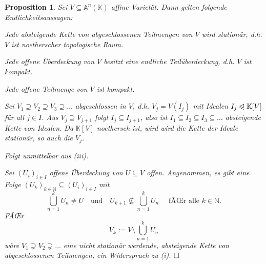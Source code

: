 \documentclass[11pt]{book}
\newtheorem{prop}[theorem]{Proposition}
\theoremstyle{nonumberbreak}
\newenvironment{pr}[1][]{\ifthenelse{\equal{#1}{}}{\proof}{\proof[#1]}\rm}{\endproof}
\begin{document}
\begin{spacing}{1.3}
\begin{prop} %
Sei $V\subseteq \mathbb{A}^n(\mathbb{K})$ affine Varietät. Dann gelten folgende Endlichkeitsaussagen:
\begin{compactenum}
\item Jede absteigende Kette von abgeschlossenen Teilmengen von $V$ wird stationär, d.h. $V$ ist \textit{noetherscher} topologische Raum.
\item Jede offene Überdeckung von $V$ besitzt eine endliche Teilüberdeckung, d.h. $V$ ist kompakt.
\item Jede offene Teilmenge von $V$ ist kompakt.
\end{compactenum}
\begin{pr}
\begin{compactenum}
\item Sei $V_1 \supseteq V_2 \supseteq V_3 \supseteq \ldots$ abgeschlossen in $V$, d.h. $V_j=V(I_j)$ mit Idealen $I_j \trianglelefteqslant \mathbb{K}[V]$ für all $j \in I$. Aus $V_j \supseteq V_{j+1}$ folgt $I_j \subseteq I_{j+1}$, also ist $I_1 \subseteq I_2 \subseteq I_3 \subseteq \ldots$ absteigende Kette von Idealen. Da $\mathbb{K}[V]$ noethersch ist, wird wird die Kette der Ideale stationär, so auch die $V_j$.
\item Folgt unmittelbar aus (iii).
\item Sei $(U_i)_{i\in I}$ offene Überdeckung von $U \subseteq V$ offen. Angenommen, es gibt eine Folge $(U_k)_{k\in \mathbb{N}} \subseteq (U_i)_{i\in I}$ mit
$$\bigcup_{n=1}^k U_n \neq U \quad \textrm{und}\quad U_{k+1} \nsubseteq \bigcup_{n=1}^k U_n \quad \textrm{ fÃŒr alle } k \in \mathbb{N}.$$
FÃŒr $$V_k := V \setminus \bigcup_{n=1}^k U_n$$
wäre $V_1 \supsetneq V_2 \supsetneq \ldots$ eine nicht stationär werdende, absteigende Kette von abgeschlossenen Teilmengen, ein Widerspruch zu (i). $\hfill \Box$
\end{compactenum}
\end{pr}
\end{prop}


\end{spacing}
\end{document}
